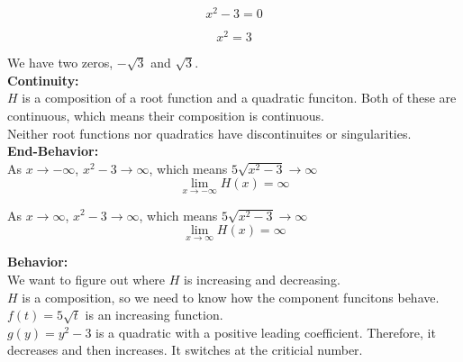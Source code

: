 \documentclass{ximera}
\begin{document}
\[
x^2-3 = 0
\]

\[
x^2 = 3
\]


We have two zeros, $-\sqrt{3}$ and $\sqrt{3}$. \\




\textbf{\textcolor{blue!55!black}{Continuity:}} \\


$H$ is a composition of a root function and a quadratic funciton.  Both of these are continuous, which means their composition is continuous. \\

Neither root functions nor quadratics have discontinuites or singularities. \\





\textbf{\textcolor{blue!55!black}{End-Behavior:}} \\


As $x \to -\infty$, $x^2 -3 \to \infty$, which means $5 \sqrt{x^2 -3} \to \infty$ \\

\[
\lim\limits_{x \to -\infty} H(x) = \infty
\]

As $x \to \infty$, $x^2 -3 \to \infty$, which means $5 \sqrt{x^2 -3} \to \infty$ \\


\[
\lim\limits_{x \to \infty} H(x) = \infty
\]











\textbf{\textcolor{blue!55!black}{Behavior:}} \\


We want to figure out where $H$ is increasing and decreasing. \\

$H$ is a composition, so we need to know how the component funcitons behave. \\





$f(t) = 5 \sqrt{t}$ is an increasing function. \\

$g(y) = y^2 - 3$ is a quadratic with a positive leading coefficient.  Therefore, it decreases and then increases.   It switches at the criticial number.\\
\end{document}
